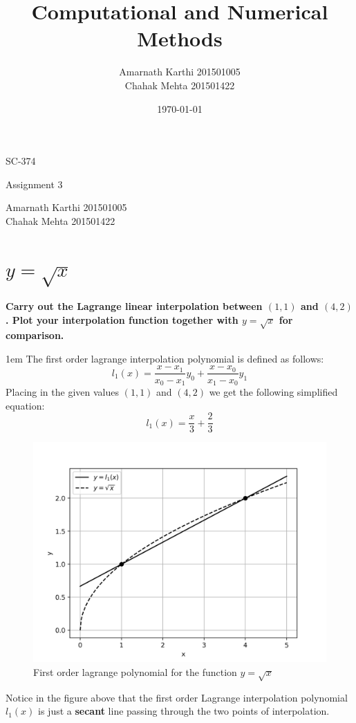\documentclass[12,a4paper]{article}
\title{Computational and Numerical Methods}
\date{\today}
\author{Amarnath Karthi  201501005 \\ Chahak Mehta  201501422}
\begin{document}
    \begin{titlepage}
	    \centering
	    {\scshape\LARGE SC-374 \par}
	    \vspace{0.1cm}
	    {\huge \@title \par}
	    \vspace{0.5cm}
	    {\Large Assignment 3\par}
	    \vspace{10cm}
	    \Large Amarnath Karthi          201501005\\
	    \Large Chahak Mehta             201501422\\
	    \vspace{5cm}
	    {\large \@date\par}
    \end{titlepage}
    \section{$y = \sqrt{x}$}
    \textbf{Carry out the Lagrange linear interpolation between $(1,1)$ and $(4,2)$. Plot your interpolation function together with $y = \sqrt{x}$ for comparison.}

    \parskip 1em
    The first order lagrange interpolation polynomial is defined as follows:
    \begin{equation}
    \label{eq:1}
    l_1(x) = \frac{x - x_1}{x_0-x_1}y_0 + \frac{x - x_0}{x_1 - x_0}y_1
    \end{equation}
    Placing in the given values $(1,1)$ and $(4,2)$ we get the following simplified equation:
    \begin{equation}
        l_1(x) = \frac{x}{3}+\frac{2}{3}
    \end{equation}
    \begin{figure}[H]
        \centering
        \includegraphics[width=\textwidth]{plots/q1.png}
        \caption{First order lagrange polynomial for the function $y = \sqrt{x}$}
        \label{fig:q1}
    \end{figure}
    Notice in the figure above that the first order Lagrange interpolation polynomial $l_1(x)$ is just a \textbf{secant} line passing through the two points of interpolation.
    \newpage
\end{document}
